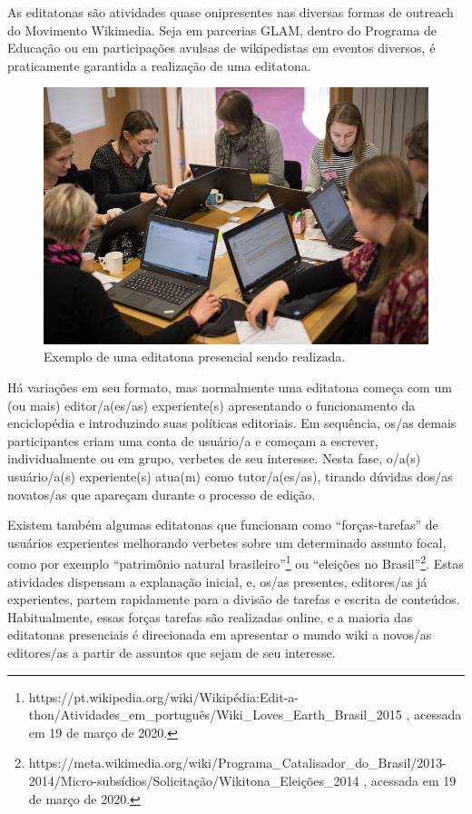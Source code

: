 As editatonas são atividades quase onipresentes nas diversas formas de outreach do Movimento Wikimedia. Seja em parcerias GLAM, \citep{robichaud_wikipedia_2017} dentro do Programa de Educação \citep{marques_wikipedia_2013} ou em participações avulsas de wikipedistas em eventos diversos, \citep{campany_using_2018} é praticamente garantida a realização de uma editatona.

\begin{figure}[H]
    \centering
    \includegraphics[width=1\textwidth]{Images/editatona_antiga.jpg}
    \caption{Exemplo de uma editatona presencial sendo realizada.}
    \label{fig:editatona_antiga}
\end{figure}

Há variações em seu formato, mas normalmente uma editatona começa com um (ou mais) editor/a(es/as) experiente(s) apresentando o funcionamento da enciclopédia e introduzindo suas políticas editoriais. Em sequência, os/as demais participantes criam uma conta de usuário/a e começam a escrever, individualmente ou em grupo, verbetes de seu interesse. Nesta fase, o/a(s) usuário/a(s) experiente(s) atua(m) como tutor/a(es/as), tirando dúvidas dos/as novatos/as que apareçam durante o processo de edição.

Existem também algumas editatonas que funcionam como ``forças-tarefas'' de usuários experientes melhorando verbetes sobre um determinado assunto focal, como por exemplo ``patrimônio natural brasileiro''\footnote{https://pt.wikipedia.org/wiki/Wikipédia:Edit-a-thon/Atividades\_em\_português/Wiki\_Loves\_Earth\_Brasil\_2015 , acessada em 19 de março de 2020.} ou ``eleições no Brasil''\footnote{https://meta.wikimedia.org/wiki/Programa\_Catalisador\_do\_Brasil/2013-2014/Micro-subsídios/Solicitação/Wikitona\_Eleições\_2014 , acessada em 19 de março de 2020.}. Estas atividades dispensam a explanação inicial, e, os/as presentes, editores/as já experientes, partem rapidamente para a divisão de tarefas e escrita de conteúdos. Habitualmente, essas forças tarefas são realizadas online, e a maioria das editatonas presenciais é direcionada em apresentar o mundo wiki a novos/as editores/as a partir de assuntos que sejam de seu interesse.

